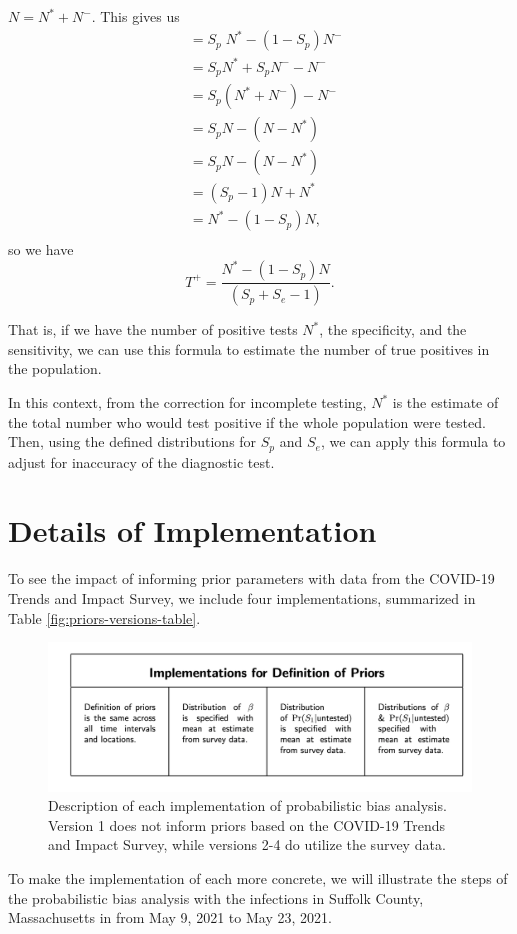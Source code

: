 \documentclass[12pt,twoside]{smiththesis}
\begin{document}
\noindent \(N =N^* + N^-\). This gives us
\begin{align*} &=S_p \;N^* -   (1-S_p)  N^-\\
&=  S_p   N^* + S_p  N^- - N^-\\
&=  S_p(N^* +  N^-) - N^- \\
&=  S_pN - (N-N^*) \\
&=  S_pN - (N-N^*) \\
&=  (S_p-1)N + N^* \\
&=  N^* - (1-S_p)N,\\
\end{align*}
so we have
\[
 T^+ = \dfrac{ N^*- (1-S_p)N}{(S_p + S_e - 1)}.
\]

That is, if we have the number of positive tests \(N^*\), the specificity, and the sensitivity, we can use this formula to estimate the number of true positives in the population.

In this context, from the correction for incomplete testing, \(N^*\) is the estimate of the total number who would test positive if the whole population were tested. Then, using the defined distributions for \(S_p\) and \(S_e\), we can apply this formula to adjust for inaccuracy of the diagnostic test.

\hypertarget{details-of-implementation}{%
\chapter{Details of Implementation}\label{details-of-implementation}}

To see the impact of informing prior parameters with data from the COVID-19 Trends and Impact Survey, we include four implementations, summarized in Table \ref{fig:priors-versions-table}.
\begin{figure}
\includegraphics[width=1\linewidth]{figure/priors_implementations} \caption{\label{fig:priors-versions-table}Description of each implementation of probabilistic bias analysis. Version 1 does not inform priors based on the COVID-19 Trends and Impact Survey, while versions 2-4 do utilize the survey data.}\label{fig:unnamed-chunk-53}
\end{figure}
To make the implementation of each more concrete, we will illustrate the steps of the probabilistic bias analysis with the infections in Suffolk County, Massachusetts in from May 9, 2021 to May 23, 2021.
\end{document}
